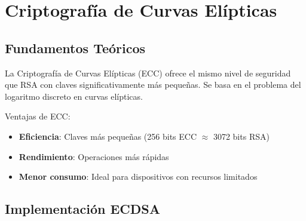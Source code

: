 \documentclass[12pt,a4paper]{article}
\begin{document}
\section{Criptografía de Curvas Elípticas}

\subsection{Fundamentos Teóricos}

La Criptografía de Curvas Elípticas (ECC) ofrece el mismo nivel de seguridad
que RSA con claves significativamente más pequeñas. Se basa en el problema del
logaritmo discreto en curvas elípticas.

Ventajas de ECC:
\begin{itemize}
	\item \textbf{Eficiencia}: Claves más pequeñas (256 bits ECC $\approx$ 3072 bits RSA)
	\item \textbf{Rendimiento}: Operaciones más rápidas
	\item \textbf{Menor consumo}: Ideal para dispositivos con recursos limitados
\end{itemize}

\subsection{Implementación ECDSA}
\end{document}
